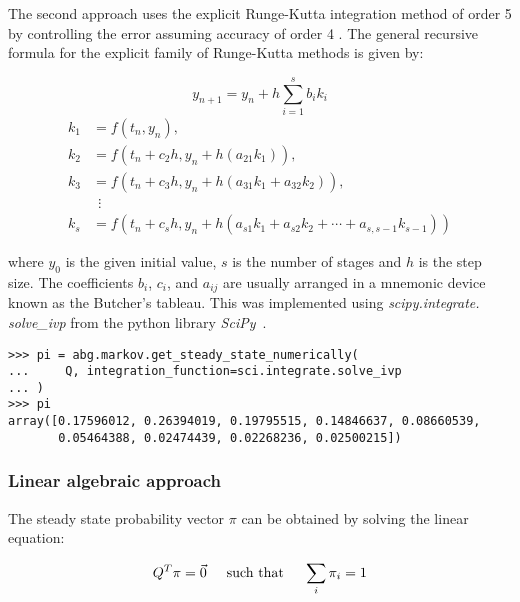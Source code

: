 The second approach uses the explicit Runge-Kutta integration method of order 5
by controlling the error assuming accuracy of order 4
\cite{solve_ivp_rk45_method, runge_kutta_formulas}.
The general recursive formula for the explicit family of Runge-Kutta methods is
given by:

\begin{equation}
    y_{n+1} = y_n + h \sum_{i=1}^s b_i k_i
\end{equation}
\begin{align}
    k_1 & = f(t_n, y_n), \nonumber \\
    k_2 & = f(t_n+c_2h, y_n+h(a_{21}k_1)), \nonumber \\
    k_3 & = f(t_n+c_3h, y_n+h(a_{31}k_1+a_{32}k_2)), \nonumber \\
        & \ \ \vdots \nonumber \\
    k_s & = f(t_n+c_s h, y_n+h(a_{s1}k_1+a_{s2}k_2+\cdots+a_{s,s-1}k_{s-1}))
    \nonumber
\end{align}

where \(y_0\) is the given initial value, \(s\) is the number of stages and
\(h\) is the step size.
The coefficients \(b_i\), \(c_i\), and \(a_{ij}\) are usually arranged in a
mnemonic device known as the Butcher's tableau.
This was implemented using \textit{scipy.integrate. solve\_ivp} from the python
library \textit{SciPy}~\cite{2020SciPy-NMeth}.

\begin{lstlisting}[style=pystyle]
>>> pi = abg.markov.get_steady_state_numerically(
...     Q, integration_function=sci.integrate.solve_ivp
... )
>>> pi
array([0.17596012, 0.26394019, 0.19795515, 0.14846637, 0.08660539,
       0.05464388, 0.02474439, 0.02268236, 0.02500215])

\end{lstlisting}


\subsubsection{Linear algebraic approach}

The steady state probability vector \( \pi \) can be obtained by solving the
linear equation:

\begin{equation}\label{eq:numpy_linalg_solve_1}
    Q^T \pi = \vec{0} \hspace{0.5cm} \text{such that} \hspace{0.5cm}
    \sum_{i} \pi_i = 1
\end{equation}

